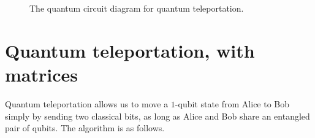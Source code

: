 \documentclass[12pt]{amsart}
\newif\ifdraft
\newcommand{\asz}[1]{\ifdraft\textcolor{violet}{[ASZ: #1]}\fi}
\begin{document}
\begin{figure}
\caption{The quantum circuit diagram for quantum teleportation.}%
\label{fig:quantum-teleportation-circuit}
\end{figure}

\section{Quantum teleportation, with matrices}\label{sec:teleportation-matrices}

\asz{Trying again}

Quantum teleportation allows us to move a $1$-qubit state from Alice to Bob
simply by sending two classical bits, as long as Alice and Bob share an
entangled pair of qubits.  The algorithm is as follows.
\end{document}
